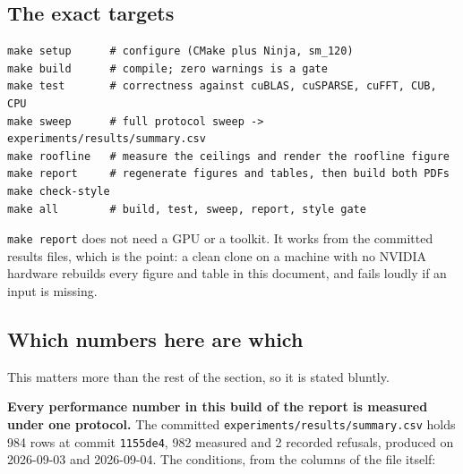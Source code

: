 \subsection{The exact targets}

\begin{verbatim}
make setup      # configure (CMake plus Ninja, sm_120)
make build      # compile; zero warnings is a gate
make test       # correctness against cuBLAS, cuSPARSE, cuFFT, CUB, CPU
make sweep      # full protocol sweep -> experiments/results/summary.csv
make roofline   # measure the ceilings and render the roofline figure
make report     # regenerate figures and tables, then build both PDFs
make check-style
make all        # build, test, sweep, report, style gate
\end{verbatim}

\texttt{make report} does not need a GPU or a toolkit. It works from the committed
results files, which is the point: a clean clone on a machine with no NVIDIA
hardware rebuilds every figure and table in this document, and fails loudly if an
input is missing.

\subsection{Which numbers here are which}

This matters more than the rest of the section, so it is stated bluntly.

\textbf{Every performance number in this build of the report is measured under one
protocol.} The committed \texttt{experiments/results/summary.csv} holds 984 rows at
commit \texttt{1155de4}, 982 measured and 2 recorded refusals, produced on
2026-09-03 and 2026-09-04. The conditions, from the columns of the file itself:

